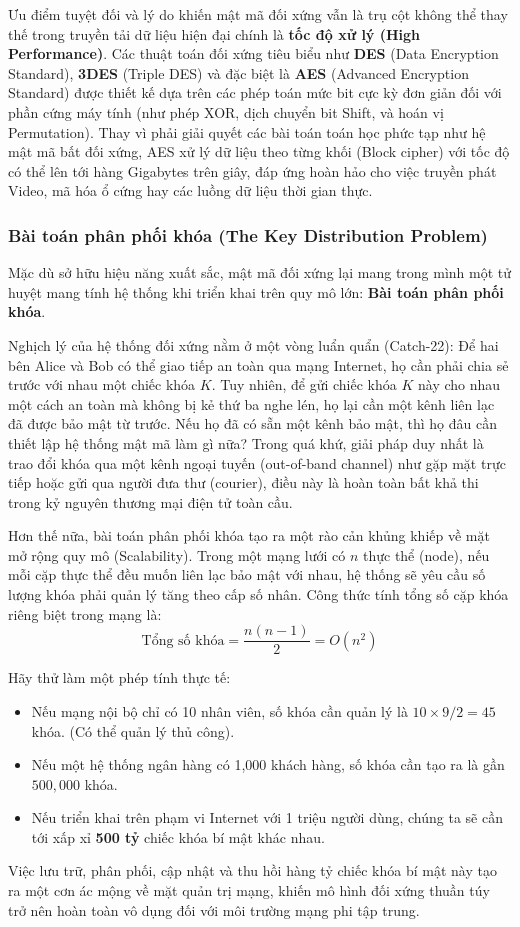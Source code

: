 Ưu điểm tuyệt đối và lý do khiến mật mã đối xứng vẫn là trụ cột không thể thay thế trong truyền tải dữ liệu hiện đại chính là \textbf{tốc độ xử lý (High Performance)}. Các thuật toán đối xứng tiêu biểu như \textbf{DES} (Data Encryption Standard), \textbf{3DES} (Triple DES) và đặc biệt là \textbf{AES} (Advanced Encryption Standard) được thiết kế dựa trên các phép toán mức bit cực kỳ đơn giản đối với phần cứng máy tính (như phép XOR, dịch chuyển bit Shift, và hoán vị Permutation). Thay vì phải giải quyết các bài toán toán học phức tạp như hệ mật mã bất đối xứng, AES xử lý dữ liệu theo từng khối (Block cipher) với tốc độ có thể lên tới hàng Gigabytes trên giây, đáp ứng hoàn hảo cho việc truyền phát Video, mã hóa ổ cứng hay các luồng dữ liệu thời gian thực.

\subsubsection*{Bài toán phân phối khóa (The Key Distribution Problem)}

Mặc dù sở hữu hiệu năng xuất sắc, mật mã đối xứng lại mang trong mình một tử huyệt mang tính hệ thống khi triển khai trên quy mô lớn: \textbf{Bài toán phân phối khóa}.

Nghịch lý của hệ thống đối xứng nằm ở một vòng luẩn quẩn (Catch-22): Để hai bên Alice và Bob có thể giao tiếp an toàn qua mạng Internet, họ cần phải chia sẻ trước với nhau một chiếc khóa $K$. Tuy nhiên, để gửi chiếc khóa $K$ này cho nhau một cách an toàn mà không bị kẻ thứ ba nghe lén, họ lại cần một kênh liên lạc đã được bảo mật từ trước. Nếu họ đã có sẵn một kênh bảo mật, thì họ đâu cần thiết lập hệ thống mật mã làm gì nữa? Trong quá khứ, giải pháp duy nhất là trao đổi khóa qua một kênh ngoại tuyến (out-of-band channel) như gặp mặt trực tiếp hoặc gửi qua người đưa thư (courier), điều này là hoàn toàn bất khả thi trong kỷ nguyên thương mại điện tử toàn cầu.

Hơn thế nữa, bài toán phân phối khóa tạo ra một rào cản khủng khiếp về mặt mở rộng quy mô (Scalability). Trong một mạng lưới có $n$ thực thể (node), nếu mỗi cặp thực thể đều muốn liên lạc bảo mật với nhau, hệ thống sẽ yêu cầu số lượng khóa phải quản lý tăng theo cấp số nhân. Công thức tính tổng số cặp khóa riêng biệt trong mạng là:
$$ \text{Tổng số khóa} = \frac{n(n-1)}{2} = O(n^2) $$

Hãy thử làm một phép tính thực tế:
\begin{itemize}
    \item Nếu mạng nội bộ chỉ có 10 nhân viên, số khóa cần quản lý là $10 \times 9 / 2 = 45$ khóa. (Có thể quản lý thủ công).
    \item Nếu một hệ thống ngân hàng có 1,000 khách hàng, số khóa cần tạo ra là gần $500,000$ khóa.
    \item Nếu triển khai trên phạm vi Internet với 1 triệu người dùng, chúng ta sẽ cần tới xấp xỉ \textbf{500 tỷ} chiếc khóa bí mật khác nhau.
\end{itemize}
Việc lưu trữ, phân phối, cập nhật và thu hồi hàng tỷ chiếc khóa bí mật này tạo ra một cơn ác mộng về mặt quản trị mạng, khiến mô hình đối xứng thuần túy trở nên hoàn toàn vô dụng đối với môi trường mạng phi tập trung.

